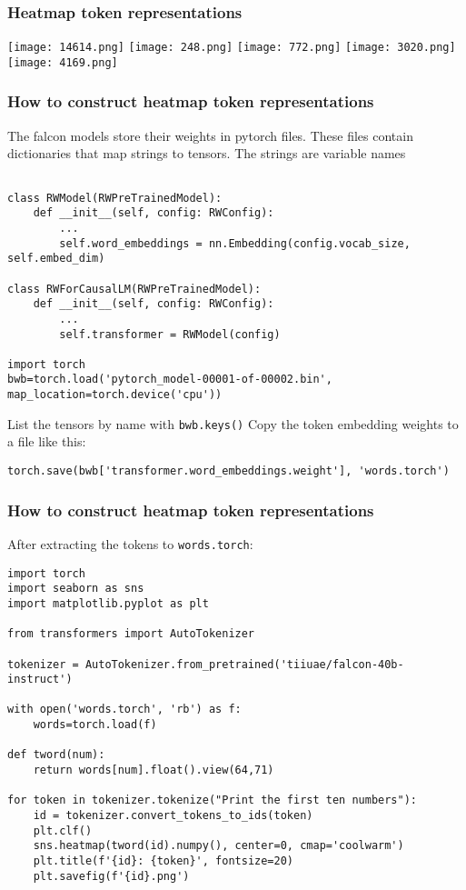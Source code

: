 \documentclass{beamer}
\begin{document}
\begin{frame}
\frametitle{Heatmap token representations}
\texttt{[image: 14614.png]}
\texttt{[image: 248.png]}
\texttt{[image: 772.png]}
\texttt{[image: 3020.png]}
\texttt{[image: 4169.png]}
\end{frame}

\begin{frame}[fragile]
\frametitle{How to construct heatmap token representations}
The falcon models store their weights in pytorch files.
\vskip 12pt
These files contain dictionaries that map strings to tensors.
\vskip 12pt
The strings are variable names
{\tiny\begin{verbatim}

class RWModel(RWPreTrainedModel):
    def __init__(self, config: RWConfig):
        ...
        self.word_embeddings = nn.Embedding(config.vocab_size, self.embed_dim)

class RWForCausalLM(RWPreTrainedModel):
    def __init__(self, config: RWConfig):
        ...
        self.transformer = RWModel(config)

import torch
bwb=torch.load('pytorch_model-00001-of-00002.bin', map_location=torch.device('cpu'))
\end{verbatim}}
List the tensors by name with {\tt bwb.keys()}
\vskip 12pt
Copy the token embedding weights to a file like this:
{\tiny\begin{verbatim}
torch.save(bwb['transformer.word_embeddings.weight'], 'words.torch')
\end{verbatim}}
\end{frame}

\begin{frame}[fragile]
\frametitle{How to construct heatmap token representations}
After extracting the tokens to {\tt words.torch}:
\tiny\begin{verbatim}
import torch
import seaborn as sns
import matplotlib.pyplot as plt

from transformers import AutoTokenizer

tokenizer = AutoTokenizer.from_pretrained('tiiuae/falcon-40b-instruct')

with open('words.torch', 'rb') as f:
    words=torch.load(f)

def tword(num):
    return words[num].float().view(64,71)

for token in tokenizer.tokenize("Print the first ten numbers"):
    id = tokenizer.convert_tokens_to_ids(token)
    plt.clf()
    sns.heatmap(tword(id).numpy(), center=0, cmap='coolwarm')
    plt.title(f'{id}: {token}', fontsize=20)
    plt.savefig(f'{id}.png')

\end{verbatim}
\end{frame}
\end{document}

